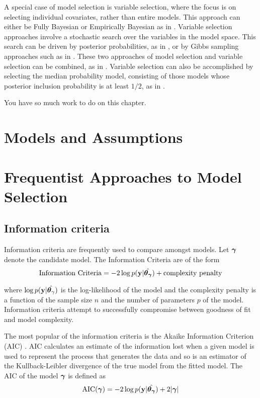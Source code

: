 \documentclass{amsart}[12pt]
\newcommand{\mgc}[1]{{\color{blue}#1}}
\begin{document}
A special case of model selection is variable selection, where the focus is on selecting individual
covariates, rather than entire models. This approach can either be Fully Bayesian or Empirically Bayesian as
in \citep{Cui2008}. Variable selection approaches involve a stochastic search over the variables in the model
space. This search can be driven by posterior probabilities, as in \citep{Casella2006}, or by Gibbs sampling
approaches such as in \citep{George1993}. These two approaches of model selection and variable selection can
be combined, as in \citep{Geweke1996}. Variable selection can also be accomplished by selecting the median
probability model, consisting of those models whose posterior inclusion probability is at least $1/2$, as in
\citep{Barbieri2004}.


\mgc{You have so much work to do on this chapter.}

\section{Models and Assumptions}

\section{Frequentist Approaches to Model Selection}
\subsection{Information criteria}
Information criteria are frequently used to compare amongst models. Let ${\boldsymbol \gamma}$ denote the candidate model.
The Information Criteria are of the form
\[
\text{Information Criteria} = -2 \log p({\bf y} | \hat{{\boldsymbol \theta}_{\boldsymbol \gamma}}) + \text{complexity penalty}
\]

where $\log p({\bf y} | \hat{{\boldsymbol \theta}_\gamma})$ is the log-likelihood of the model and the complexity penalty is
a function of the sample size $n$ and the number of parameters $p$ of the model. Information criteria attempt
to successfully compromise between goodness of fit and model complexity.

The most popular of the information criteria is the Akaike Information Criterion (AIC) \cite{Akaike1974}. AIC
calculates an estimate of the information lost when a given model is used to represent the process that
generates the data and so is an estimator of the Kullback-Leibler divergence of the true model from the fitted
model. The AIC of the model ${\boldsymbol \gamma}$ is defined as
\[
	\text{AIC}({\boldsymbol \gamma}) = -2 \log p({\bf y} | \hat{{\boldsymbol \theta}_{\boldsymbol \gamma}}) + 2 |{\boldsymbol \gamma}|
\]
\end{document}
